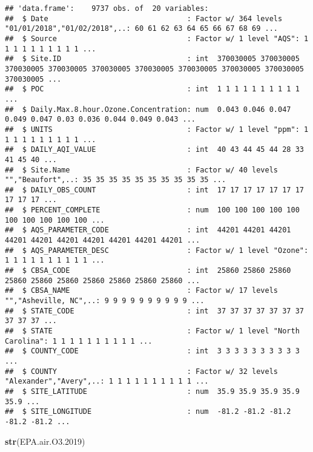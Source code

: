 \documentclass[]{article}
\newenvironment{Shaded}{\begin{snugshade}}{\end{snugshade}}
\newcommand{\FloatTok}[1]{\textcolor[rgb]{0.00,0.00,0.81}{#1}}
\newcommand{\KeywordTok}[1]{\textcolor[rgb]{0.13,0.29,0.53}{\textbf{#1}}}
\newcommand{\NormalTok}[1]{#1}
\begin{document}
\begin{verbatim}
## 'data.frame':    9737 obs. of  20 variables:
##  $ Date                                : Factor w/ 364 levels "01/01/2018","01/02/2018",..: 60 61 62 63 64 65 66 67 68 69 ...
##  $ Source                              : Factor w/ 1 level "AQS": 1 1 1 1 1 1 1 1 1 1 ...
##  $ Site.ID                             : int  370030005 370030005 370030005 370030005 370030005 370030005 370030005 370030005 370030005 370030005 ...
##  $ POC                                 : int  1 1 1 1 1 1 1 1 1 1 ...
##  $ Daily.Max.8.hour.Ozone.Concentration: num  0.043 0.046 0.047 0.049 0.047 0.03 0.036 0.044 0.049 0.043 ...
##  $ UNITS                               : Factor w/ 1 level "ppm": 1 1 1 1 1 1 1 1 1 1 ...
##  $ DAILY_AQI_VALUE                     : int  40 43 44 45 44 28 33 41 45 40 ...
##  $ Site.Name                           : Factor w/ 40 levels "","Beaufort",..: 35 35 35 35 35 35 35 35 35 35 ...
##  $ DAILY_OBS_COUNT                     : int  17 17 17 17 17 17 17 17 17 17 ...
##  $ PERCENT_COMPLETE                    : num  100 100 100 100 100 100 100 100 100 100 ...
##  $ AQS_PARAMETER_CODE                  : int  44201 44201 44201 44201 44201 44201 44201 44201 44201 44201 ...
##  $ AQS_PARAMETER_DESC                  : Factor w/ 1 level "Ozone": 1 1 1 1 1 1 1 1 1 1 ...
##  $ CBSA_CODE                           : int  25860 25860 25860 25860 25860 25860 25860 25860 25860 25860 ...
##  $ CBSA_NAME                           : Factor w/ 17 levels "","Asheville, NC",..: 9 9 9 9 9 9 9 9 9 9 ...
##  $ STATE_CODE                          : int  37 37 37 37 37 37 37 37 37 37 ...
##  $ STATE                               : Factor w/ 1 level "North Carolina": 1 1 1 1 1 1 1 1 1 1 ...
##  $ COUNTY_CODE                         : int  3 3 3 3 3 3 3 3 3 3 ...
##  $ COUNTY                              : Factor w/ 32 levels "Alexander","Avery",..: 1 1 1 1 1 1 1 1 1 1 ...
##  $ SITE_LATITUDE                       : num  35.9 35.9 35.9 35.9 35.9 ...
##  $ SITE_LONGITUDE                      : num  -81.2 -81.2 -81.2 -81.2 -81.2 ...
\end{verbatim}

\begin{Shaded}
\begin{Highlighting}[]
\KeywordTok{str}\NormalTok{(EPA.air.O3}\FloatTok{.2019}\NormalTok{)}
\end{Highlighting}
\end{Shaded}
\end{document}
